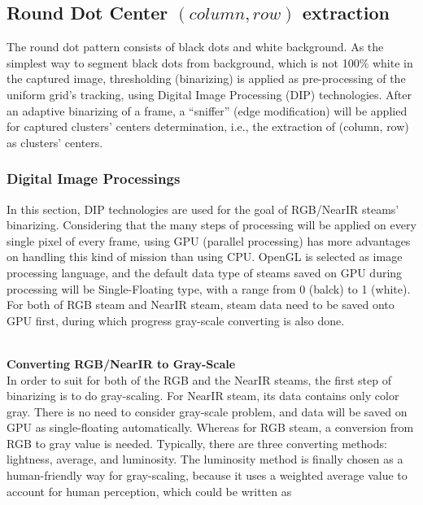 \subsection{Round Dot Center \((column, row)\) extraction}
\label{RowColumnExtraction}
The round dot pattern consists of black dots and white background. As the simplest way to segment black dots from background, which is not 100\% white in the captured image, thresholding (binarizing) is applied as pre-processing of the uniform grid's tracking, using Digital Image Processing (DIP) technologies. After an adaptive binarizing of a frame, a \enquote{sniffer} (edge modification) will be applied for captured clusters' centers determination, i.e., the extraction of (column, row) as clusters' centers.\par
%
\subsubsection{Digital Image Processings}
In this section, DIP technologies are used for the goal of RGB/NearIR steams' binarizing. Considering that the many steps of processing will be applied on every single pixel of every frame, using GPU (parallel processing) has more advantages on handling this kind of mission than using CPU. OpenGL is selected as image processing language, and the default data type of steams saved on GPU during processing will be Single-Floating type, with a range from 0 (balck) to 1 (white). For both of RGB steam and NearIR steam, steam data need to be saved onto GPU first, during which progress gray-scale converting is also done.\\%
\\\par%
 \qquad \textbf{Converting RGB/NearIR to Gray-Scale}\\%
In order to suit for both of the RGB and the NearIR steams, the first step of binarizing is to do gray-scaling. For NearIR steam, its data contains only color gray. There is no need to consider gray-scale problem, and data will be saved on GPU as single-floating automatically. Whereas for RGB steam, a conversion from RGB to gray value is needed. Typically, there are three converting methods: lightness, average, and luminosity. The luminosity method is finally chosen as a human-friendly way for gray-scaling, because it uses a weighted average value to account for human perception, which could be written as

